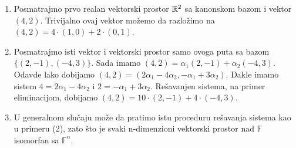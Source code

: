 \documentclass{article}
\begin{document}
\begin{example}
  \begin{enumerate}
    \item Posmatrajmo prvo realan vektorski prostor $\mathbb{R}^2$ sa kanonskom bazom i vektor $(4, 2)$.
      Trivijalno ovaj vektor možemo da razložimo na $(4, 2) = 4 \cdot (1, 0) + 2 \cdot (0, 1)$.
    \item Posmatrajmo isti vektor i vektorski prostor samo ovoga puta sa bazom $\{(2, -1), (-4, 3)\}$.
      Sada imamo $(4, 2) = \alpha_1 (2, -1) + \alpha_2 (-4, 3)$.
      Odavde lako dobijamo $(4, 2) = (2 \alpha_1 - 4 \alpha_2, -\alpha_1 + 3 \alpha_2)$.
      Dakle imamo sistem $4 = 2 \alpha_1 - 4 \alpha_2$ i $2 = -\alpha_1 + 3 \alpha_2$.
      Rešavanjen sistema, na primer eliminacijom, dobijamo $(4, 2) = 10 \cdot (2, -1) + 4 \cdot (-4, 3)$.
    \item U generalnom slučaju može da pratimo istu proceduru rešavanja sistema kao u primeru (2), zato što je svaki n-dimenzioni vektorski prostor nad $\mathbb{F}$ isomorfan sa $\mathbb{F}^n$.
  \end{enumerate}
\end{example}
\end{document}
